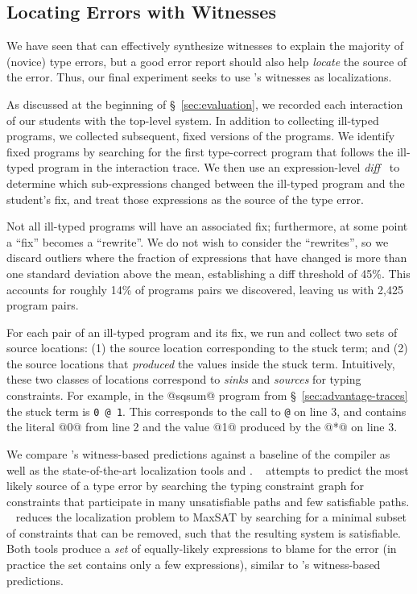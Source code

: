 
\subsection{Locating Errors with Witnesses}
\label{sec:locating}

We have seen that \toolname can effectively synthesize witnesses to
explain the majority of (novice) type errors, but a good error report
should also help \emph{locate} the source of the error.
%
Thus, our final experiment seeks to use \toolname's witnesses as
localizations.


As discussed at the beginning of \S~\ref{sec:evaluation}, we recorded
each interaction of our students with the \ocaml top-level system.
%
In addition to collecting ill-typed programs, we collected
subsequent, fixed versions of the programs.
%
We identify fixed programs by searching for the first type-correct
program that follows the ill-typed program in the interaction trace.
%
We then use an expression-level \emph{diff}~\cite{Lempsink2009-xf} to
determine which sub-expressions changed between the ill-typed program
and the student's fix, and treat those expressions as the source of the
type error.

Not all ill-typed programs will have an associated fix; furthermore,
at some point a ``fix'' becomes a ``rewrite''.
%
We do not wish to consider the ``rewrites'', so we discard outliers
where the fraction of expressions that have changed is more than one
standard deviation above the mean, establishing a diff threshold of
45\%.
%
This accounts for roughly 14\% of programs pairs we discovered, leaving
us with 2,425 program pairs.

For each pair of an ill-typed program and its fix, we run \toolname and
collect two sets of source locations:
%
(1) the source location corresponding to the stuck term; and
%
(2) the source locations that \emph{produced} the values inside the
stuck term.
%
Intuitively, these two classes of locations correspond to \emph{sinks}
and \emph{sources} for typing constraints.
%
For example, in the @sqsum@ program from \S~\ref{sec:advantage-traces}
the stuck term is \verb!0 @ 1!.
%
This corresponds to the call to \verb!@! on line 3, and contains
the literal @0@ from line 2 and the value @1@ produced by the
@*@ on line 3.

We compare \toolname's witness-based predictions against a baseline of
the \ocaml compiler as well as the state-of-the-art %
localization tools \sherrloc and \mycroft.
%
\sherrloc~\cite{Zhang2014-lv} attempts to predict the most likely source
of a type error by searching the typing constraint graph for constraints
that participate in many unsatisfiable paths and few satisfiable paths.
%
\mycroft~\cite{Loncaric2016-uk} reduces the localization problem to
MaxSAT by searching for a minimal subset of constraints that can be
removed, such that the resulting system is satisfiable.
%
Both tools produce a \emph{set} of equally-likely expressions to blame
for the error (in practice the set contains only a few expressions),
similar to \toolname's witness-based predictions.

